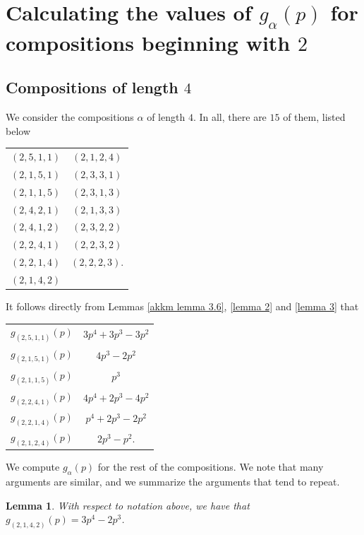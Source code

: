 \documentclass[a4paper]{amsart}
\newtheorem{lemma}[theorem]{Lemma}
\numberwithin{equation}{section}
\theoremstyle{remark}
\begin{document}
\section{Calculating the values of $g_\alpha(p)$ for compositions beginning with $2$}\label{s 4}
\subsection{Compositions of length $4$} We consider the compositions $\alpha$ of length $4$. In all, there are $15$ of them, listed below
\begin{table}[H]
\centering
 \begin{tabular}{c c } 
 \hline
 $(2,5,1,1)$ & $(2,1,2,4)$\\ 
 $(2,1,5,1)$ & $(2,3,3,1)$\\
 $(2,1,1,5)$ & $(2,3,1,3)$\\
 $(2,4,2,1)$ & $(2,1,3,3)$ \\
 $(2,4,1,2)$ & $(2,3,2,2)$ \\
 $(2,2,4,1)$ & $(2,2,3,2)$\\
 $(2,2,1,4)$ & $(2,2,2,3)$.\\
 $(2,1,4,2)$ & \\
\hline
\end{tabular}
\end{table}
\noindent It follows directly from Lemmas \ref{akkm lemma 3.6}, \ref{lemma 2} and \ref{lemma 3} that
\begin{table}[H]
\centering
 \begin{tabular}{c c } 
 \hline
 $g_{(2,5,1,1)}(p)$ & $3p^4+3p^3-3p^2$\\ 
 $g_{(2,1,5,1)}(p)$ & $4p^3-2p^2$\\
 $g_{(2,1,1,5)}(p)$ & $p^3$\\
 $g_{(2,2,4,1)}(p)$ & $4p^4+2p^3-4p^2$\\
 $g_{(2,2,1,4)}(p)$ & $p^4+2p^3-2p^2$\\
 $g_{(2,1,2,4)}(p)$ & $2p^3-p^2$.\\
\hline
\end{tabular}
\end{table}
\noindent We compute $g_\alpha(p)$ for the rest of the compositions. We note that many arguments are similar, and we summarize the arguments that tend to repeat.  
\begin{lemma}\label{lemma 4.1}
With respect to notation above, we have that $g_{(2,1,4,2)}(p) =3p^4-2p^3$.
\end{lemma}
\end{document}
